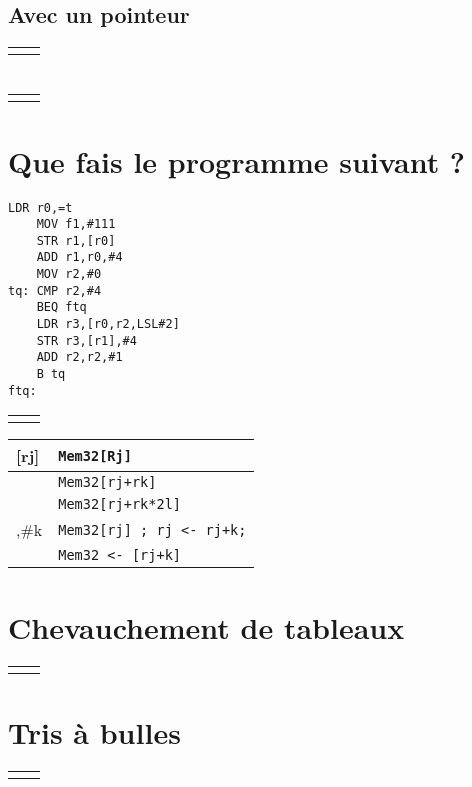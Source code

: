 \documentclass[12pt,a4paper,openany]{book}
\begin{document}
\subsection{Avec un pointeur}
\begin{tabular}{p{6cm}p{6cm}}

	&

\end{tabular}
\section{}
\begin{tabular}{p{6cm}p{6cm}}

	&

\end{tabular}
\section{Que fais le programme suivant ? }
\begin{lstlisting}[language=ARM]
	LDR r0,=t
	MOV f1,#111
	STR r1,[r0]
	ADD r1,r0,#4
	MOV r2,#0
tq: CMP r2,#4
	BEQ ftq
	LDR r3,[r0,r2,LSL#2]
	STR r3,[r1],#4
	ADD r2,r2,#1
	B tq
ftq:
\end{lstlisting}
\begin{tabular}{p{6cm}p{6cm}}

	&

\end{tabular}
\appendix
\begin{tabular}{l l}
	[rj] & \texttt{Mem32[Rj]}\\
	\hline
	[rj,rk] & \texttt{Mem32[rj+rk]}\\
	\hline
	[rj,rk,LSL\#l] & \texttt{Mem32[rj+rk*2l]}\\
	\hline
	[rj],\#k & \texttt{Mem32[rj] ; rj <- rj+k;}\\
	\hline
	[rj,\#k] & \texttt{Mem32 <- [rj+k]}\\
\end{tabular}
\section{Chevauchement de tableaux}
\begin{tabular}{p{6cm}p{6cm}}

	&

\end{tabular}
\section{Tris à bulles}
\begin{tabular}{p{6cm}p{6cm}}

	&

\end{tabular}
\end{document}
